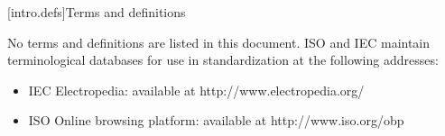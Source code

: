 
[intro.defs]{Terms and definitions}

\pnum
{}%
No terms and definitions are listed in this document. ISO and IEC maintain
terminological databases for use in standardization at the following addresses:

\begin{itemize}
    \item IEC Electropedia: available at http://www.electropedia.org/
    \item ISO Online browsing platform: available at http://www.iso.org/obp
\end{itemize}
